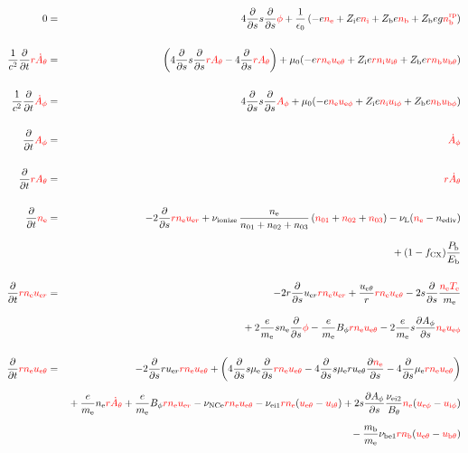 \documentclass[11pt]{article}
\def\r#1{{\rm#1}}
\def\ddt{\frac{\partial}{\partial t}}
\def\dds{\frac{\partial}{\partial s}}
\def\dd#1{\frac{\partial #1}{\partial s}}
\def\me{m_\r{e}}
\def\mb{m_\r{b}}
\def\mue{\mu_\r{e}}
\def\nee{n_\r{e}}
\def\ni{n_\r{i}}
\def\nb{n_\r{b}}
\def\uer{u_{\r{e}r}}
\def\ueth{u_{\r{e}\theta}}
\def\uith{u_{\r{i}\theta}}
\def\ubth{u_{\r{b}\theta}}
\def\ueph{u_{\r{e}\phi}}
\def\uiph{u_{\r{i}\phi}}
\def\ubph{u_{\r{b}\phi}}
\def\Bth{B_\theta}
\def\Bph{B_\phi}
\def\Athd{\dot{A}_\theta}
\def\Aphd{\dot{A}_\phi}
\def\Ath{A_\theta}
\def\Aph{A_\phi}
\def\Te{T_\r{e}}
\def\nna{n_{01}}
\def\nnb{n_{02}}
\def\nnc{n_{03}}
\def\Zi{Z_\r{i}}
\def\Zb{Z_\r{b}}
\def\Pb{P_\r{b}}
\def\Eb{E_\r{b}}
\def\nbrp{n_\r{b}^\r{rp}}
\def\fCX{f_\r{CX}}
\def\nuNCe{\nu_\r{NCe}}
\def\nuL{\nu_\r{L}}
\def\nuion{\nu_\r{ionize}}
\def\nediv{n_\r{ediv}}
\def\red#1{\textcolor{red}{#1}}
\begin{document}
\begin{eqnarray}
  0 &=&
%
    4 \dds s \dds \red{\phi}
%
  + \frac{1}{\epsilon_0}
%
    \left(-e \red{\nee} + \Zi e \red{\ni} + \Zb e \red{\nb} + \Zb e g \red{\nbrp} \right)
\\[5mm]
  \frac{1}{c^2} \ddt \red{r \Athd} &=&
%
    \left(   4 \dds s \dds \red{r \Ath}
%
           - 4 \dds \red{r \Ath} \right)
%
  + \mu_0 (-e \red{r \nee \ueth} + \Zi e \red{r \ni \uith} + \Zb e \red{r \nb \ubth})
\\[5mm]
  \frac{1}{c^2} \ddt \red{\Aphd} &=&
%
    4 \dds s \dds \red{\Aph}
%
  + \mu_0 (-e \red{\nee \ueph} + \Zi e \red{\ni \uiph} + \Zb e \red{\nb \ubph})
%
\\[5mm]
  \ddt \red{\Aph} &=&
%
  \red{\Aphd}
\\[5mm]
  \ddt \red{r \Ath} &=&
%
  \red{r \Athd}
\\[5mm]
  \ddt \red{\nee} &=&
%
  - 2 \dds \red{r \nee \uer} 
%
  + \nuion\, \frac{\nee}{\nna + \nnb + \nnc}\, (\red{\nna} + \red{\nnb}
  + \red{\nnc})
%
  - \nuL (\red{\nee} - \nediv)
\nonumber\\[3mm]&&{}
%
  + (1 - \fCX) \frac{\Pb}{\Eb}
\\[5mm]
  \ddt \red{r \nee \uer} &=&
%
  - 2 r \dds \uer \red{r \nee \uer}
%
  + \frac{\ueth}{r} \red{r \nee \ueth}
%
  - 2 s \dds \frac{\red{\nee \Te}}{\me}
\nonumber\\[3mm]&&{}
%
  + 2 \frac{e}{\me} s \nee \dds \red{\phi}
%
  - \frac{e}{\me} \Bph \red{r \nee \ueth}
%
  - 2 \frac{e}{\me} s \dd{\Aph} \red{\nee \ueph}
\\[5mm]
  \ddt \red{r \nee \ueth} &=&
%
  - 2 \dds r \uer \red{r \nee \ueth}
%
  + \left(    4 \dds s \mue \dds \red{r \nee \ueth}
%
            - 4 \dds s \mue r \ueth \dd{\red{\nee}}
%
            - 4 \dds \mue \red{r \nee \ueth} \right)
\nonumber\\[2.5mm]&&{}
%
  + \frac{e}{\me} \nee \red{r \Athd}
%
  + \frac{e}{\me} \Bph \red{r \nee \uer}
%
  - \nuNCe \red{r \nee \ueth}
%
  - \nu_\r{ei1} \red{r \nee} (\red{\ueth} - \red{\uith})
%
  + 2 s \dd{\Aph} \frac{\nu_\r{ei2}}{\Bth} \red{\nee} (\red{\ueph} - \red{\uiph})
\nonumber\\[2.5mm]&&{}
%
  - \frac{\mb}{\me} \nu_\r{be1} \red{r \nb} (\red{\ueth} - \red{\ubth})

\end{eqnarray}
\end{document}
